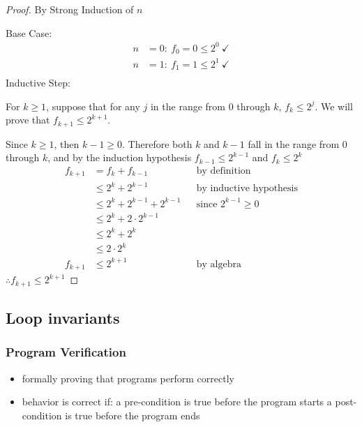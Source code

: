 \begin{proof}
  By Strong Induction of $n$

  Base Case:
  \begin{align*}
    n & = 0:~f_0 = 0 \leq 2^0~\checkmark \\
    n & = 1:~f_1 = 1 \leq 2^1~\checkmark \\
  \end{align*}
  Inductive Step:

  For $k\geq1$, suppose that for any $j$ in the range from $0$ through $k$, $f_k\leq2^j$.
  We will prove that $f_{k+1}\leq2^{k+1}$.

  Since $k\geq1$, then $k-1\geq0$. Therefore both $k$ and $k-1$ fall in the range from
  $0$ through $k$, and by the induction hypothesis $f_{k-1}\leq2^{k-1}$ and $f_k\leq2^k$
  \begin{align*}
    f_{k+1} & = f_k + f_{k-1}              &  & \text{by definition}           \\
            & \leq 2^k + 2^{k-1}           &  & \text{by inductive hypothesis} \\
            & \leq 2^k + 2^{k-1} + 2^{k-1} &  & \text{since $2^{k-1} \geq 0$}  \\
            & \leq 2^k + 2 \cdot 2^{k-1}                                       \\
            & \leq 2^k + 2^k                                                   \\
            & \leq 2 \cdot 2^k                                                 \\
    f_{k+1} & \leq 2^{k+1}                 &  & \text{by algebra}
  \end{align*}
  $\therefore f_{k+1} \leq 2^{k+1}$
\end{proof}

\subsection{Loop invariants}
\subsubsection*{Program Verification}
\begin{itemize}
  \item formally proving that programs perform correctly
  \item behavior is correct if:
        \subitem a pre-condition is true before the program starts
        \subitem a post-condition is true before the program ends
\end{itemize}
